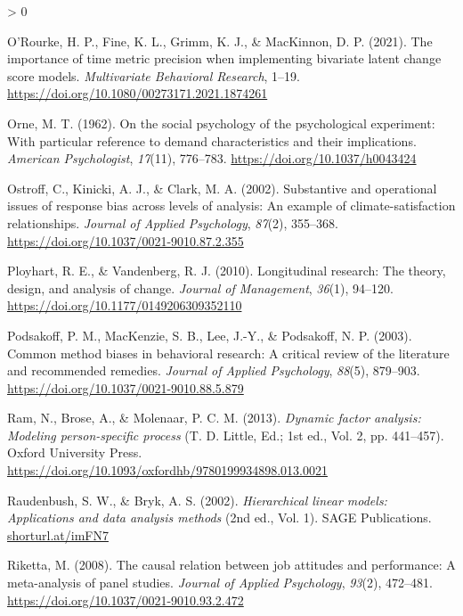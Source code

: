 \documentclass[
12pt, %
twoside,
english]{guelphthesis}
\newlength{\cslhangindent}
\newenvironment{CSLReferences}[2] %
 {%
  \setlength{\parindent}{0pt}
  \ifodd #1 \everypar{\setlength{\hangindent}{\cslhangindent}}\ignorespaces\fi
  \ifnum #2 > 0
  \setlength{\parskip}{\linespacing{2}}
  \fi
 }%
 {}
\begin{document}
\begin{CSLReferences}{1}{0}
\leavevmode{}%
O'Rourke, H. P., Fine, K. L., Grimm, K. J., \& MacKinnon, D. P. (2021). The importance of time metric precision when implementing bivariate latent change score models. \emph{Multivariate Behavioral Research}, 1--19. \url{https://doi.org/10.1080/00273171.2021.1874261}

\leavevmode{}%
Orne, M. T. (1962). On the social psychology of the psychological experiment: With particular reference to demand characteristics and their implications. \emph{American Psychologist}, \emph{17}(11), 776--783. \url{https://doi.org/10.1037/h0043424}

\leavevmode{}%
Ostroff, C., Kinicki, A. J., \& Clark, M. A. (2002). Substantive and operational issues of response bias across levels of analysis: An example of climate-satisfaction relationships. \emph{Journal of Applied Psychology}, \emph{87}(2), 355--368. \url{https://doi.org/10.1037/0021-9010.87.2.355}

\leavevmode{}%
Ployhart, R. E., \& Vandenberg, R. J. (2010). Longitudinal research: The theory, design, and analysis of change. \emph{Journal of Management}, \emph{36}(1), 94--120. \url{https://doi.org/10.1177/0149206309352110}

\leavevmode{}%
Podsakoff, P. M., MacKenzie, S. B., Lee, J.-Y., \& Podsakoff, N. P. (2003). Common method biases in behavioral research: A critical review of the literature and recommended remedies. \emph{Journal of Applied Psychology}, \emph{88}(5), 879--903. \url{https://doi.org/10.1037/0021-9010.88.5.879}

\leavevmode{}%
Ram, N., Brose, A., \& Molenaar, P. C. M. (2013). \emph{Dynamic factor analysis: Modeling person-specific process} (T. D. Little, Ed.; 1st ed., Vol. 2, pp. 441--457). Oxford University Press. \url{https://doi.org/10.1093/oxfordhb/9780199934898.013.0021}

\leavevmode{}%
Raudenbush, S. W., \& Bryk, A. S. (2002). \emph{Hierarchical linear models: Applications and data analysis methods} (2nd ed., Vol. 1). SAGE Publications. \href{https://shorturl.at/imFN7}{shorturl.at/imFN7}

\leavevmode{}%
Riketta, M. (2008). The causal relation between job attitudes and performance: A meta-analysis of panel studies. \emph{Journal of Applied Psychology}, \emph{93}(2), 472--481. \url{https://doi.org/10.1037/0021-9010.93.2.472}


\end{CSLReferences}
\end{document}
